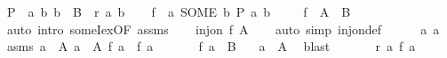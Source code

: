 \begin{isabellebody}
\ {\isacharquery}{\kern0pt}P\ {\isacharequal}{\kern0pt}\ {\isachardoublequoteopen}{\isasymlambda}a\ b{\isachardot}{\kern0pt}\ b\ {\isasymin}\ B\ {\isasymand}\ r\ a\ b{\isachardoublequoteclose}\isanewline
\ \ \isamarkupfalse%
\ {\isacharquery}{\kern0pt}f\ {\isacharequal}{\kern0pt}\ {\isachardoublequoteopen}{\isasymlambda}a{\isachardot}{\kern0pt}\ SOME\ b{\isachardot}{\kern0pt}\ {\isacharquery}{\kern0pt}P\ a\ b{\isachardoublequoteclose}\isanewline
\ \ \isamarkupfalse%
\ {}{\isacharcolon}{\kern0pt}\ {\isachardoublequoteopen}{\isacharquery}{\kern0pt}f\ {\isacharbackquote}{\kern0pt}\ A\ {\isasymsubseteq}\ B{\isachardoublequoteclose}\ \ \isamarkupfalse%
\ {\isacharparenleft}{\kern0pt}auto\ intro{\isacharcolon}{\kern0pt}\ someI{}{\isacharunderscore}{\kern0pt}ex{\isacharbrackleft}{\kern0pt}OF\ assms{\isacharparenleft}{\kern0pt}{}{\isacharparenright}{\kern0pt}{\isacharbrackright}{\kern0pt}{\isacharparenright}{\kern0pt}\isanewline
\ \ \isamarkupfalse%
\ {\isachardoublequoteopen}inj{\isacharunderscore}{\kern0pt}on\ {\isacharquery}{\kern0pt}f\ A{\isachardoublequoteclose}\isanewline
\ \ \isamarkupfalse%
\ {\isacharparenleft}{\kern0pt}auto\ simp{\isacharcolon}{\kern0pt}\ inj{\isacharunderscore}{\kern0pt}on{\isacharunderscore}{\kern0pt}def{\isacharparenright}{\kern0pt}\isanewline
\ \ \ \ \isamarkupfalse%
\ a{}\ a{}\ \isamarkupfalse%
\ asms{\isacharcolon}{\kern0pt}\ {\isachardoublequoteopen}a{}\ {\isasymin}\ A{\isachardoublequoteclose}\ {\isachardoublequoteopen}a{}\ {\isasymin}\ A{\isachardoublequoteclose}\ {\isachardoublequoteopen}{\isacharquery}{\kern0pt}f\ a{}\ {\isacharequal}{\kern0pt}\ {\isacharquery}{\kern0pt}f\ a{}{\isachardoublequoteclose}\isanewline
\ \ \ \ \isamarkupfalse%
\ {}{\isacharcolon}{\kern0pt}\ {\isachardoublequoteopen}{\isacharquery}{\kern0pt}f\ a{}\ {\isasymin}\ B{\isachardoublequoteclose}\ \isamarkupfalse%
\ {\isachardoublequoteopen}{}{\isachardoublequoteclose}\ {\isacartoucheopen}a{}\ {\isasymin}\ A{\isacartoucheclose}\ \isamarkupfalse%
\ blast\isanewline
\ \ \ \ \isamarkupfalse%
\ {}{\isacharcolon}{\kern0pt}\ {\isachardoublequoteopen}r\ a{}\ {\isacharparenleft}{\kern0pt}{\isacharquery}{\kern0pt}f\ a{}{\isacharparenright}{\kern0pt}{\isachardoublequoteclose}\ \isamarkupfalse%

\end{isabellebody}
